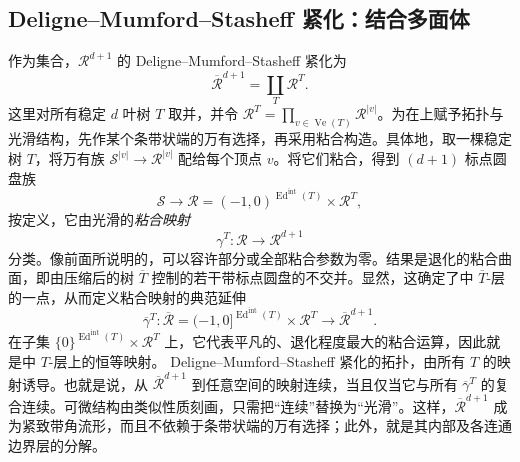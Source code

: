 \subsection{Deligne–Mumford–Stasheff 紧化：结合多面体}\label{sec:9f}
作为集合，$\mathcal R^{d+1}$ 的 Deligne–Mumford–Stasheff 紧化为
\begin{equation}\label{eq:9.11}
\overline{\mathcal R}^{d+1}=\coprod_T\mathcal R^T.
\end{equation}
这里对所有稳定 $d$ 叶树 $T$ 取并，并令 $\mathcal R^T=\prod_{v\in\operatorname{Ve}(T)}\mathcal R^{|v|}$。为在上赋予拓扑与光滑结构，先作某个条带状端的万有选择，再采用粘合构造。具体地，取一棵稳定树 $T$，将万有族 $\mathcal S^{|v|}\to\mathcal R^{|v|}$ 配给每个顶点 $v$。将它们粘合，得到 $(d+1)$ 标点圆盘族
\begin{equation}\label{eq:9.12}
\mathcal S\longrightarrow\mathcal R=(-1,0)^{\operatorname{Ed}^{\mathrm{int}}(T)}\times\mathcal R^T,
\end{equation}
按定义，它由光滑的\emph{粘合映射}
\begin{equation}\label{eq:9.13}
\gamma^T:\mathcal R\longrightarrow\mathcal R^{d+1}
\end{equation}
分类。像前面所说明的，可以容许部分或全部粘合参数为零。结果是退化的粘合曲面，即由压缩后的树 $\overline T$ 控制的若干带标点圆盘的不交并。显然，这确定了中 $\overline T$-层的一点，从而定义粘合映射的典范延伸
\begin{equation}\label{eq:9.14}
\overline\gamma^T:\overline{\mathcal R}=(-1,0]^{\operatorname{Ed}^{\mathrm{int}}(T)}\times\mathcal R^T\longrightarrow\overline{\mathcal R}^{d+1}.
\end{equation}
在子集 $\{0\}^{\operatorname{Ed}^{\mathrm{int}}(T)}\times\mathcal R^T$ 上，它代表平凡的、退化程度最大的粘合运算，因此就是中 $T$-层上的恒等映射。
Deligne–Mumford–Stasheff 紧化的拓扑，由所有 $T$ 的映射诱导。也就是说，从 $\overline{\mathcal R}^{d+1}$ 到任意空间的映射连续，当且仅当它与所有 $\overline\gamma^T$ 的复合连续。可微结构由类似性质刻画，只需把“连续”替换为“光滑”。这样，$\overline{\mathcal R}^{d+1}$ 成为紧致带角流形，而且不依赖于条带状端的万有选择；此外，就是其内部及各连通边界层的分解。

